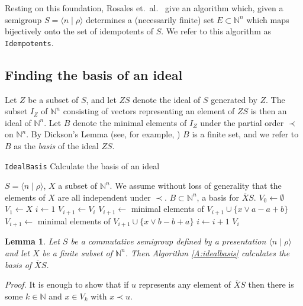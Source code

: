 \documentclass{acmconf}
\newtheorem{lemma}{Lemma}
\begin{document}
Resting on this foundation, Rosales et.~al.~\cite{pRGG99} give an 
algorithm  which,
given a semigroup $S = \langle n \mid \rho \rangle$ determines
a (necessarily finite) 
set $E \subset \mathbb{N}^n$ which maps bijectively onto the set of idempotents
of $S$. 
We refer to this algorithm as {\tt Idempotents}.


\subsection{Finding the basis of an ideal}
Let $Z$ be a subset of $S$, and let $ZS$ denote the 
ideal of $S$ generated by $Z$. The 
subset $I_Z$ of $\mathbb{N}^n$ consisting of
vectors representing an element of  $ZS$ 
is then an ideal of $\mathbb{N}^n$. Let $B$ denote the minimal 
elements of $I_Z$ under the partial order $\prec$ on $\mathbb{N}^n$.
By Dickson's Lemma (see, for example, \cite{bBeckWeis}) $B$ is a finite set,
and we refer to $B$ as the {\em basis} of the ideal $ZS$.

\begin{algorithm}
\caption{{\tt IdealBasis} Calculate the basis of an ideal}
\label{A:idealbasis}
\begin{algorithmic}[1]
\REQUIRE $S = \langle n \mid \rho \rangle$, $X$ a subset of $\mathbb{N}^n$.
We assume without loss of generality that the elements of $X$ are 
all independent under $\prec$.
\ENSURE $B \subset \mathbb{N}^n$, a basis for $\overline{X}S$.
\STATE $V_0 \leftarrow \emptyset$
\STATE $V_1 \leftarrow X$
\STATE $i \leftarrow 1$
        \STATE $V_{i+1} \leftarrow V_i$
                 \label{step:forward}
                        \STATE $V_{i+1} \leftarrow $ minimal elements of 
                                $V_{i+1} \cup \{x \vee a - a + b\}$
                        \STATE $V_{i+1} \leftarrow $ minimal elements of 
                                $V_{i+1} \cup \{x \vee b - b + a\}$
                \ENDFOR
        \ENDFOR
        \STATE $i \leftarrow i + 1$
\ENDWHILE
{} $V_i$
\end{algorithmic}
\end{algorithm}


\begin{lemma}
Let $S$ be a commutative semigroup defined by a presentation $\langle
n\mid\rho\rangle$ and let $X$ be a finite subset of $\mathbb{N}^n$. Then
Algorithm \ref{A:idealbasis} calculates the basis
of $\overline{X}S$.
\end{lemma}
\emph{Proof.}
It is enough to show that if $u$ represents any element of
$\overline{X}S$ then there is some $k \in \mathbb{N}$ and
$x \in V_k$ with $x \prec u$. 
\end{document}
